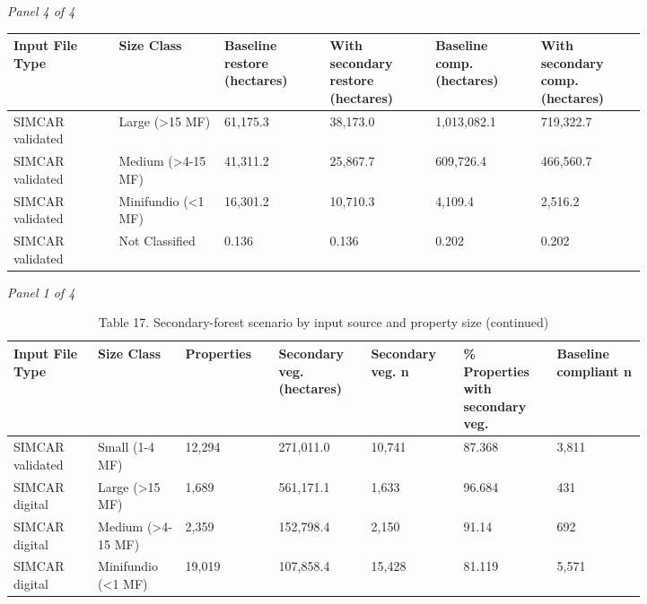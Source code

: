 \documentclass[12pt]{article}
\begin{document}
\begin{landscape}
\begin{table}[H]
\textit{Panel 4 of 4}\\[2pt]
{\fontsize{12}{14}\selectfont
\setlength{\tabcolsep}{3pt}
\renewcommand{\arraystretch}{1.08}
\begin{tabular}{p{0.137\linewidth}p{0.137\linewidth}p{0.137\linewidth}p{0.137\linewidth}p{0.137\linewidth}p{0.137\linewidth}}
\toprule
Input File Type & Size Class & Baseline restore (hectares) & With secondary restore (hectares) & Baseline comp. (hectares) & With secondary comp. (hectares) \\
\midrule
SIMCAR validated & Large (>15 MF) & 61,175.3 & 38,173.0 & 1,013,082.1 & 719,322.7 \\
SIMCAR validated & Medium (>4-15 MF) & 41,311.2 & 25,867.7 & 609,726.4 & 466,560.7 \\
SIMCAR validated & Minifundio (<1 MF) & 16,301.2 & 10,710.3 & 4,109.4 & 2,516.2 \\
SIMCAR validated & Not Classified & 0.136 & 0.136 & 0.202 & 0.202 \\
\bottomrule
\end{tabular}
}
\end{table}
\begin{table}[H]
\centering
\caption{Table 17. Secondary-forest scenario by input source and property size (continued)}
\textit{Panel 1 of 4}\\[2pt]
{\fontsize{12}{14}\selectfont
\setlength{\tabcolsep}{3pt}
\renewcommand{\arraystretch}{1.08}
\begin{tabular}{p{0.117\linewidth}p{0.117\linewidth}p{0.117\linewidth}p{0.117\linewidth}p{0.117\linewidth}p{0.117\linewidth}p{0.117\linewidth}}
\toprule
Input File Type & Size Class & Properties & Secondary veg. (hectares) & Secondary veg. n & \% Properties with secondary veg. & Baseline compliant n \\
\midrule
SIMCAR validated & Small (1-4 MF) & 12,294 & 271,011.0 & 10,741 & 87.368 & 3,811 \\
SIMCAR digital & Large (>15 MF) & 1,689 & 561,171.1 & 1,633 & 96.684 & 431 \\
SIMCAR digital & Medium (>4-15 MF) & 2,359 & 152,798.4 & 2,150 & 91.14 & 692 \\
SIMCAR digital & Minifundio (<1 MF) & 19,019 & 107,858.4 & 15,428 & 81.119 & 5,571 \\
\bottomrule
\end{tabular}
}

\vspace{0.6em}


\end{table}
\end{landscape}
\end{document}
